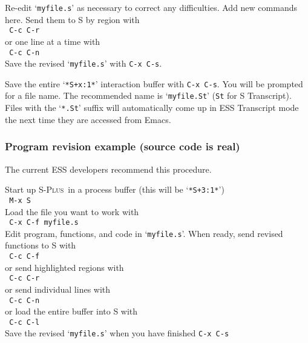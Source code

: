 \documentclass{article}
\newcommand*{\Splus}{\textsc{S-Plus}}
\newcommand{\stexttt}[1]{{\small\texttt{#1}}}
\newcommand{\elcode}[1]{\\{\stexttt{\hspace*{2em} #1}}\\}
\newcommand{\file}[1]{`\stexttt{#1}'}
\begin{document}
Re-edit \file{myfile.s} as necessary to correct any difficulties.  Add
new commands here.  Send them to S by region with
  \elcode{C-c C-r}
or one line at a time with
  \elcode{C-c C-n}
Save the revised \file{myfile.s} with \stexttt{C-x C-s}.

Save the entire \file{*S+x:1*} interaction buffer with \stexttt{C-x C-s}.
You will be prompted for a file name.  The recommended name is
\file{myfile.St} (\stexttt{St} for S Transcript).
Files with the \file{*.St} suffix will automatically come up in ESS
Transcript mode the next time they are accessed from Emacs.


\subsubsection{Program revision example (source code is real)}
The current ESS developers recommend this procedure.

\noindent
Start up \Splus\ in a process buffer (this will be \file{*S+3:1*})
  \elcode{M-x S}
Load the file you want to work with
  \elcode{C-x C-f myfile.s}
Edit program, functions, and code in \file{myfile.s}.
When ready, send revised functions to S with
  \elcode{C-c C-f}
or send highlighted regions with
  \elcode{C-c C-r}
or send individual lines with
  \elcode{C-c C-n}
or load the entire buffer into S with
  \elcode{C-c C-l}
Save the revised \file{myfile.s} when you have finished
  \stexttt{C-x C-s}



\end{document}
